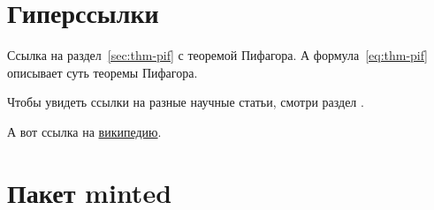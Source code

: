 \documentclass{../civarticle}
\begin{document}
\section{Гиперссылки}
\label{sec:hyper}

Ссылка на раздел~\ref{sec:thm-pif} с теоремой Пифагора.  А
формула~\eqref{eq:thm-pif} описывает суть теоремы Пифагора.

Чтобы увидеть ссылки на разные научные статьи, смотри раздел
\hyperref[sec:ref-to-articles]{}.

А вот ссылка на \href{https://ru.wikipedia.org}{википедию}.


\section{Пакет minted}
\label{sec:minted}
\if \MINTED\empty
\else \inputminted{python}{code.py} \fi
\end{document}
